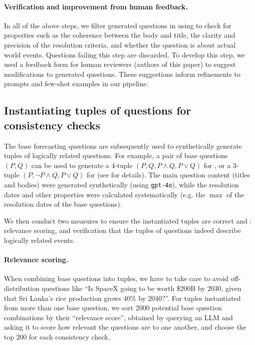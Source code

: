 \paragraph{Verification and improvement from human feedback.}
In all of the above steps, we filter generated questions in using \gptfouro{} to check for properties such as the coherence between the body and title, the clarity and precision of the resolution criteria, and whether the question is about actual world events.
Questions failing this step are discarded.
To develop this step, we used a feedback form for human reviewers (authors of this paper) to suggest modifications to generated questions. These suggestions inform refinements to prompts and few-shot examples in our pipeline.

\subsection{Instantiating tuples of questions for consistency checks}
\label{cfc:sec:instantiation}

The base forecasting questions are subsequently used to synthetically generate tuples of logically related questions. For example, a pair of base questions $(P,Q)$ can be used to generate a 4-tuple $(P,Q,P\land Q,P\lor Q)$ for \AndOrChecker{}, or a 3-tuple $(P,\lnot P\land Q, P\lor Q)$ for \ButChecker{} (see  for details). The main question content (titles and bodies) were generated synthetically (using \texttt{gpt-4o}), while the resolution dates and other properties were calculated systematically (e.g. the $\max$ of the resolution dates of the base questions).

We then conduct two measures to ensure the instantiated tuples are correct and : relevance scoring, and verification that the tuples of questions indeed describe logically related events.

\paragraph{Relevance scoring.}
When combining base questions into tuples, we have to take care to avoid off-distribution questions like ``Is SpaceX going to be worth \$200B by 2030, given that Sri Lanka's rice production grows 40\% by 2040?''.
For tuples instantiated from more than one base question, we sort 2000 potential base question combinations by their ``relevance score'', obtained by querying an LLM and asking it to score how relevant the questions are to one another, and choose the top 200 for each consistency check.

